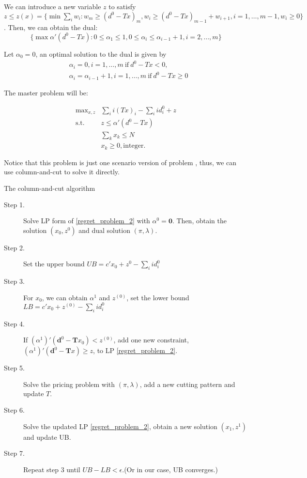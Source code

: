 We can introduce a new variable $z$ to satisfy $z \leq z(x) =\{\min \sum_{i} w_{i}: w_{m} \geq (d^{0}- Tx)_{m}, w_{i} \geq (d^{0}- Tx)_{m-1} + w_{i+1}, i =1, \ldots,m-1, w_i \geq 0 \}$. Then, we can obtain the dual:
\[\{\max \alpha{'}(d^{0}- Tx): 0 \leq \alpha_{1} \leq 1, 0 \leq \alpha_{i} \leq \alpha_{i-1} + 1, i=2,\ldots,m \}\]

Let $\alpha_0 = 0$, an optimal solution to the dual is given by
\begin{align*}
  & \alpha_{i} =0, i =1,\ldots,m \ \text{if}~  d^{0}-Tx < 0,\\ 
  & \alpha_{i} = \alpha_{i-1}+1,  i =1,\ldots,m \ \text{if}~  d^{0}-Tx \geq 0
\end{align*}

The master problem will be:

\begin{equation}\label{regret_problem_2}
  \begin{aligned}
    \mbox{max}_{x,z} & \sum_{i} i (Tx)_{i} - \sum_{i} i d^{0}_{i} + z \\
    \mbox{s.t.} \quad & z \leq \alpha{'} (d^{0}- Tx) \\
    & \sum_{k} x_{k} \leq N \\
    & x_k \geq 0, \mbox{integer}.
  \end{aligned}
\end{equation}

Notice that this problem is just one scenario version of problem , thus, we can use column-and-cut to solve it directly.

\begin{algorithm}[H]\label{column_and_cut_algo1}
  \caption{The column-and-cut algorithm}
    \begin{description}
    \item[Step 1.] Solve LP form of \eqref{regret_problem_2} with $\alpha^0 = \mathbf{0}$.
    Then, obtain the solution $(x_0, z^{0})$ and dual solution $(\pi, \lambda)$.
    \item[Step 2.] Set the upper bound $UB = c{'} x_0 +  z^{0} - \sum_{i} i d^{0}_{i}$
    \item[Step 3.]
    For $x_0$, we can obtain $\alpha^{1}$ and $z^{(0)}$, set the lower bound $LB = c{'} x_0 +  z^{(0)} - \sum_{i} i d^{0}_{i}$
    \item[Step 4.]
    If $(\alpha^{1}){'}(\mathbf{d}^{0}- \mathbf{T}x_0) < z^{(0)}$, add one new constraint, $(\alpha^{1}){'}(\mathbf{d}^{0}- \mathbf{T}x) \geq z$, to LP \eqref{regret_problem_2}.
    \item[Step 5.]
    Solve the pricing problem with $(\pi,\lambda)$, add a new cutting pattern and update $T$.
    \vspace{5pt}
    \item[Step 6.] Solve the updated LP \eqref{regret_problem_2}, obtain a new solution $(x_1, z^{1})$ and update UB.
    \item[Step 7.] Repeat step 3 until $UB - LB < \epsilon$.(Or in our case, UB converges.)
   \end{description}
  \end{algorithm}

